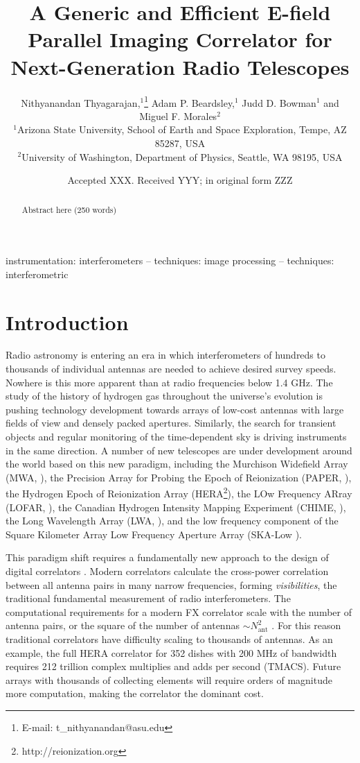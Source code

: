 \documentclass[a4paper,fleqn,usenatbib]{../mnras}
\title[E-field Parallel Imaging Correlator]{A Generic and Efficient E-field Parallel Imaging Correlator for Next-Generation Radio Telescopes}
\author[Thyagarajan et al.]{
Nithyanandan Thyagarajan,$^{1}$\thanks{E-mail: t\_nithyanandan@asu.edu}
Adam P. Beardsley,$^{1}$
Judd D. Bowman$^{1}$
\newauthor
and Miguel F. Morales$^{2}$
\\
$^{1}$Arizona State University, School of Earth and Space Exploration, Tempe, AZ 85287, USA\\
$^{2}$University of Washington, Department of Physics, Seattle, WA 98195, USA\\
}
\date{Accepted XXX. Received YYY; in original form ZZZ}
\newcommand{\Nant}{N_{\text{ant}}}
\begin{document}
\label{firstpage}
\pagerange{\pageref{firstpage}--\pageref{lastpage}}
\maketitle

\begin{abstract}
Abstract here (250 words)
\end{abstract}

\begin{keywords}
instrumentation: interferometers -- techniques: image processing -- techniques: interferometric
\end{keywords}



\section{Introduction}

Radio astronomy is entering an era in which interferometers of hundreds to thousands of individual antennas are needed to achieve desired survey speeds. Nowhere is this more apparent than at radio frequencies below 1.4 GHz. The study of the history of hydrogen gas throughout the universe's evolution is pushing technology development towards arrays of low-cost antennas with large fields of view and densely packed apertures. Similarly, the search for transient objects and regular monitoring of the time-dependent sky is driving instruments in the same direction. A number of new telescopes are under development around the world based on this new paradigm, including the Murchison Widefield Array (MWA, \citealt{tin13}), the Precision Array for Probing the Epoch of Reionization (PAPER, \citealt{par10}), the Hydrogen Epoch of Reionization Array (HERA\footnote{http://reionization.org}), the LOw Frequency ARray (LOFAR, \citealt{dev09}), the Canadian Hydrogen Intensity Mapping Experiment (CHIME, \citealt{ban14}), the Long Wavelength Array (LWA, \citealt{ell13}), and the low frequency component of the Square Kilometer Array Low Frequency Aperture Array (SKA-Low \citealt{mel13}).

This paradigm shift requires a fundamentally new approach to the design of digital correlators \citep{lon00}. Modern correlators calculate the cross-power correlation between all antenna pairs in many narrow frequencies, forming \emph{visibilities}, the traditional fundamental measurement of radio interferometers. The computational requirements for a modern FX correlator scale with the number of antenna pairs, or the square of the number of antennas $\sim \Nant^2$ \citep{bun04}. For this reason traditional correlators have difficulty scaling to thousands of antennas. As an example, the full HERA correlator for 352 dishes with 200 MHz of bandwidth requires 212 trillion complex multiplies and adds per second (TMACS). Future arrays with thousands of collecting elements will require orders of magnitude more computation, making the correlator the dominant cost.
\end{document}
